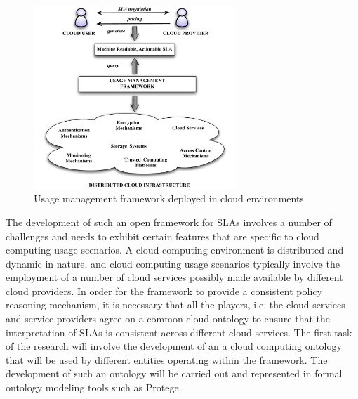 \documentclass[10pt, conference, compsocconf]{IEEEtran}
\begin{document}
\begin{figure}[!t]
\centering
\includegraphics[width=3in]{cloud-umf.pdf}
\caption{Usage management framework deployed in cloud environments}
\label{fig:cloud-umf}
\end{figure}

The development of such an open framework for SLAs involves a number of challenges and needs to exhibit certain features that are specific to cloud computing usage scenarios. A cloud computing environment is distributed and dynamic in nature, and cloud computing usage scenarios typically involve the employment of a number of cloud services possibly made available by different cloud providers. In order for the framework to provide a consistent policy reasoning mechanism, it is necessary that all the players, i.e. the cloud services and service providers agree on a common cloud ontology to ensure that the interpretation of SLAs is consistent across different cloud services. The first task of the research will involve the development of an a cloud computing ontology that will be used by different entities operating within the framework. The development of such an ontology will be carried out and represented in formal ontology modeling tools such as Protege. 
\end{document}
